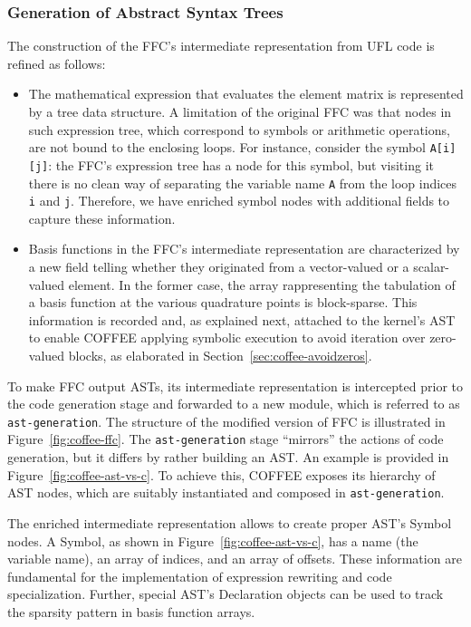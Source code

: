 \subsubsection{Generation of Abstract Syntax Trees}
The construction of the FFC's intermediate representation from UFL code is refined as follows:
\begin{itemize}
\item The mathematical expression that evaluates the element matrix is represented by a tree data structure. A limitation of the original FFC was that nodes in such expression tree, which correspond to symbols or arithmetic operations, are not bound to the enclosing loops. For instance, consider the symbol \texttt{A[i][j]}: the FFC's expression tree has a node for this symbol, but visiting it there is no clean way of separating the variable name \texttt{A} from the loop indices \texttt{i} and \texttt{j}. Therefore, we have enriched symbol nodes with additional fields to capture these information. 
\item Basis functions in the FFC's intermediate representation are characterized by a new field telling whether they originated from a vector-valued or a scalar-valued element. In the former case, the array rappresenting the tabulation of a basis function at the various quadrature points is block-sparse. This information is recorded and, as explained next, attached to the kernel's AST to enable COFFEE applying symbolic execution to avoid iteration over zero-valued blocks, as elaborated in Section~\ref{sec:coffee-avoidzeros}.
\end{itemize}
To make FFC output ASTs, its intermediate representation is intercepted prior to the code generation stage and forwarded to a new module, which is referred to as \texttt{ast-generation}. The structure of the modified version of FFC is illustrated in Figure~\ref{fig:coffee-ffc}. The \texttt{ast-generation} stage ``mirrors'' the actions of code generation, but it differs by rather building an AST. An example is provided in Figure~\ref{fig:coffee-ast-vs-c}. To achieve this, COFFEE exposes its hierarchy of AST nodes, which are suitably instantiated and composed in \texttt{ast-generation}. 

The enriched intermediate representation allows to create proper AST's Symbol nodes. A Symbol, as shown in Figure~\ref{fig:coffee-ast-vs-c}, has a name (the variable name), an array of indices, and an array of offsets. These information are fundamental for the implementation of expression rewriting and code specialization. Further, special AST's Declaration objects can be used to track the sparsity pattern in basis function arrays. 

